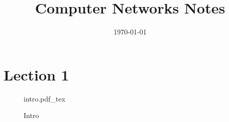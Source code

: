 \documentclass[12pt,letterpaper]{report}
\title{Computer Networks Notes}
\author{}
\date{\today}
\newcommand{\incfig}[2][1]{%
    \def\svgwidth{#1\columnwidth}
    {#2.pdf_tex}
}
\begin{document}
    \maketitle
    \tableofcontents


    \chapter{Lection 1}

\begin{figure}[ht]
    \centering
    \incfig{intro}
    \caption{Intro}
    \label{fig:intro}
\end{figure}
\end{document}

